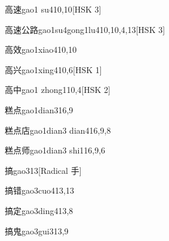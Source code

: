 \begin{entry}{高速}{gao1 su4}{10,10}[HSK 3]
\end{entry}

\begin{entry}{高速公路}{gao1su4gong1lu4}{10,10,4,13}[HSK 3]
\end{entry}

\begin{entry}{高效}{gao1xiao4}{10,10}
\end{entry}

\begin{entry}{高兴}{gao1xing4}{10,6}[HSK 1]
\end{entry}

\begin{entry}{高中}{gao1 zhong1}{10,4}[HSK 2]
\end{entry}

\begin{entry}{糕点}{gao1dian3}{16,9}
\end{entry}

\begin{entry}{糕点店}{gao1dian3 dian4}{16,9,8}
\end{entry}

\begin{entry}{糕点师}{gao1dian3 shi1}{16,9,6}
\end{entry}

\begin{entry}{搞}{gao3}{13}[Radical 手]
\end{entry}

\begin{entry}{搞错}{gao3cuo4}{13,13}
\end{entry}

\begin{entry}{搞定}{gao3ding4}{13,8}
\end{entry}

\begin{entry}{搞鬼}{gao3gui3}{13,9}
\end{entry}

